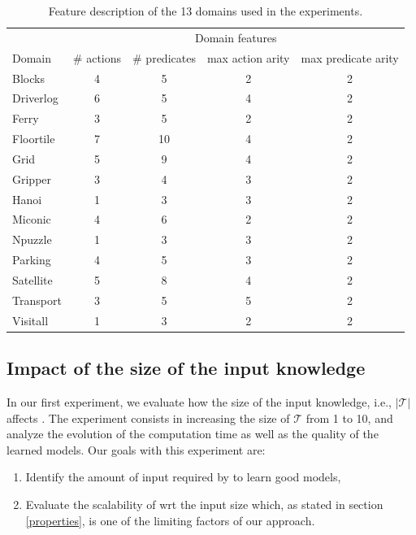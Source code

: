\begin{table}[hbt!]
		\begin{center}
			\begin{tabular}{l|c|c|c|c|}	
				& \multicolumn{4}{c|}{Domain features}\\ \cline{2-5}
				Domain & \# actions & \# predicates & max action arity & max predicate arity  \\
				\hline
				Blocks & 4 & 5 & 2 & 2  \\
				Driverlog & 6 & 5 & 4 & 2  \\
				Ferry & 3 & 5 & 2 & 2  \\
				Floortile & 7 & 10 & 4 & 2  \\
				Grid & 5 & 9 & 4 & 2  \\
				Gripper & 3 & 4 & 3 & 2  \\
				Hanoi & 1 & 3 & 3 & 2  \\
				Miconic & 4 & 6 & 2 & 2  \\
				Npuzzle & 1 & 3 & 3 & 2  \\
				Parking & 4 & 5 & 3 & 2  \\
				Satellite & 5 & 8 & 4 & 2  \\
				Transport & 3 & 5 & 5 & 2  \\
				Visitall & 1 & 3 & 2 & 2  \\
			\end{tabular}
		\end{center}
	\caption{\small Feature description of the 13 domains used in the experiments.}
	\label{tab:domain_features}	
\end{table}

\subsection{Impact of the size of the input knowledge}
In our first experiment, we evaluate how the size of the input knowledge, i.e., $\left|\mathcal{T}\right|$ affects \FAMA. The experiment consists in increasing the size of $\mathcal{T}$ from 1 to 10, and analyze the evolution of the computation time as well as the quality of the learned models. 
Our goals with this experiment are:
\begin{enumerate}
	\item Identify the amount of input required by \FAMA to learn good models,
	\item Evaluate the scalability of \FAMA wrt the input size which, as stated in section \ref{properties}, is one of the limiting factors of our approach.
\end{enumerate} 

